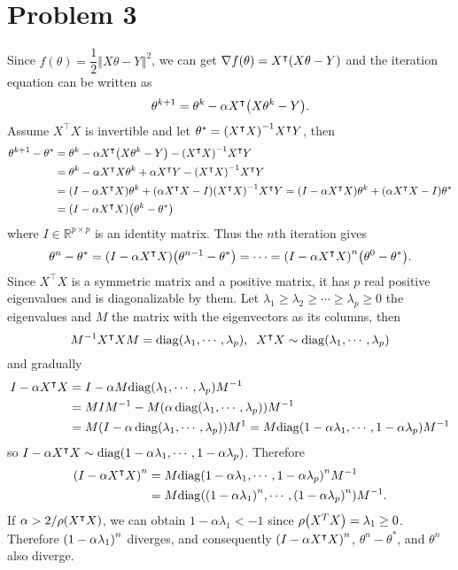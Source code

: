 \documentclass[10pt]{article}
\begin{document}
\section*{Problem 3}
Since $f(\theta) = \dfrac{1}{2}\left\Vert X\theta - Y \right\Vert^2$, we can get $\nabla f(\theta) = X^\intercal \qty(X\theta-Y)$ and the iteration equation can be written as 
$$\theta^{k+1} = \theta^{k} - \alpha X^\intercal \qty(X\theta^k-Y).$$
Assume $X^\intercal X$ is invertible and let $\theta^* = \qty(X^\intercal X)^{-1}X^\intercal Y$, then
\begin{align*}
    \theta^{k+1} - \theta^* &= \theta^{k} - \alpha X^\intercal \qty(X\theta^k-Y) - \qty(X^\intercal X)^{-1}X^\intercal Y \\
    &= \theta^k - \alpha X^\intercal X\theta^k + \alpha X^\intercal Y - \qty(X^\intercal X)^{-1}X^\intercal Y \\
    &= \qty(I - \alpha X^\intercal X)\theta^k + \qty(\alpha X^\intercal X - I)\qty(X^\intercal X)^{-1}X^\intercal Y = \qty(I - \alpha X^\intercal X)\theta^k + \qty(\alpha X^\intercal X - I)\theta^* \\
    &= \qty(I - \alpha X^\intercal X)\qty(\theta^k - \theta^*)
\end{align*}
where $I \in \mathbb{R}^{p \times p}$ is an identity matrix. Thus the $n$th iteration gives
$$\theta^n - \theta^* = \qty(I - \alpha X^\intercal X)\qty(\theta^{n-1} - \theta^*) = \cdots = \qty(I - \alpha X^\intercal X)^n\qty(\theta^0 - \theta^*).$$
Since $X^\intercal X$ is a symmetric matrix and a positive matrix, it has $p$ real positive eigenvalues and is diagonalizable by them.
Let $\lambda_1 \geq \lambda_2 \geq \cdots \geq \lambda_p \geq 0$ the eigenvalues and $M$ the matrix with the eigenvectors as its columns, then 
$$M^{-1}X^\intercal XM = \mathrm{diag}\qty(\lambda_1, \cdots, \lambda_p), \;\; X^\intercal X \sim \mathrm{diag}\qty(\lambda_1, \cdots, \lambda_p)$$
and gradually
\begin{align*}
    I - \alpha X^\intercal X &= I - \alpha M \mathrm{diag}\qty(\lambda_1, \cdots, \lambda_p)M^{-1} \\
    &= MIM^{-1} - M\qty(\alpha\,\mathrm{diag}\qty(\lambda_1, \cdots, \lambda_p))M^{-1} \\
    &= M\qty(I - \alpha\,\mathrm{diag}\qty(\lambda_1, \cdots, \lambda_p))M^{1}
    = M\mathrm{diag}\qty(1-\alpha\lambda_1, \cdots, 1-\alpha\lambda_p)M^{-1}
\end{align*}
so $I - \alpha X^\intercal X \sim \mathrm{diag}\qty(1-\alpha\lambda_1, \cdots, 1-\alpha\lambda_p)$. Therefore
\begin{align*}
    \qty(I - \alpha X^\intercal X)^n &= M\mathrm{diag}\qty(1-\alpha\lambda_1, \cdots, 1-\alpha\lambda_p)^nM^{-1} \\
    &= M\mathrm{diag}\qty(\qty(1-\alpha\lambda_1)^n, \cdots, \qty(1-\alpha\lambda_p)^n)M^{-1}.
\end{align*}
If $\alpha > {2}/{\rho\qty(X^\intercal X)}$, we can obtain $1-\alpha\lambda_1 < -1$ since $\rho\qty(X^TX) = \lambda_1 \geq 0$. Therefore $\qty(1-\alpha\lambda_1)^n$ diverges, and consequently $\qty(I - \alpha X^\intercal X)^n$, $\theta^n - \theta^*$, and $\theta^n$ also diverge.
\end{document}
